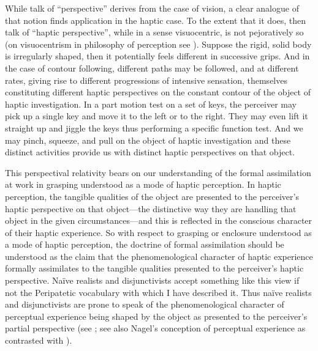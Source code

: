 While talk of ``perspective'' derives from the case of vision, a clear analogue of that notion finds application in the haptic case. To the extent that it does, then talk of ``haptic perspective'', while in a sense visuocentric, is not pejoratively so (on visuocentrism in philosophy of perception see \citealt{OCallaghan:2007xy}). Suppose the rigid, solid body is irregularly shaped, then it potentially feels different in successive grips. And in the case of contour following, different paths may be followed, and at different rates, giving rise to different progressions of intensive sensation, themselves constituting different haptic perspectives on the constant contour of the object of haptic investigation. In a part motion test on a set of keys, the perceiver may pick up a single key and move it to the left or to the right. They may even lift it straight up and jiggle the keys thus performing a specific function test. And we may pinch, squeeze, and pull on the object of haptic investigation and these distinct activities provide us with distinct haptic perspectives on that object. 

This perspectival relativity bears on our understanding of the formal assimilation at work in grasping understood as a mode of haptic perception. In haptic perception, the tangible qualities of the object are presented to the perceiver's haptic perspective on that object---the distinctive way they are handling that object in the given circumstances---and this is reflected in the conscious character of their haptic experience. So with respect to grasping or enclosure understood as a mode of haptic perception, the doctrine of formal assimilation should be understood as the claim that the phenomenological character of haptic experience formally assimilates to the tangible qualities presented to the perceiver's haptic perspective. Na\"{i}ve realists and disjunctivists accept something like this view if not the Peripatetic vocabulary with which I have described it. Thus na\"{i}ve realists and disjunctivists are prone to speak of the phenomenological character of perceptual experience being shaped by the object as presented to the perceiver's partial perspective (see \citealt{McDowell:1998vn,Martin:2004fj,Fish:2009fk,Kalderon:2011fk}; see also Nagel's \citeyear{Nagel:1979fk} conception of perceptual experience as contrasted with \citealt{Jackson:1982my}).

